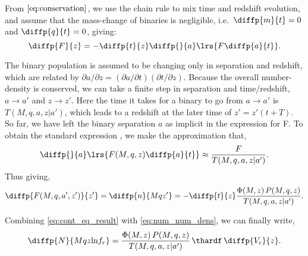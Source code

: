     From $\eqref{eq:conservation}$, we use the chain rule to mix time and redshift evolution, and assume that the mass-change of binaries is negligible, i.e.~$\diffp{m}{t} = 0$ and $\diffp{q}{t} = 0$, giving:
    \begin{equation}
        \diffp{F}{z} = - \diffp{t}{z} \diffp{}{a} \lrs{F \diffp{a}{t}}.
    \end{equation}

    The binary population is assumed to be changing only in separation and redshift, which are related by $\partial a / \partial z = (\partial a / \partial t) (\partial t / \partial z)$.  Because the overall number-density is conserved, we can take a finite step in separation and time/redshift, $a\rightarrow a'$ and $z\rightarrow z'$.  Here the time it takes for a binary to go from $a \rightarrow a'$ is $T(M,q,a,z|a')$, which leads to a redshift at the later time of $z' = z'(t + T)$.  So far, we have left the binary separation $a$ as implicit in the expression for F.  To obtain the standard expression \citep[e.g.][~Eq.~5]{Chen+2019}, we make the approximation that,
    \begin{equation}
        \diffp{}{a} \lrs{F(M,q,z) \diffp{a}{t}} \approx \frac{F}{T(M,q,a,z|a')}.
    \end{equation}
    Thus giving,
    \begin{equation}
        \label{eq:cont_eq_result}
        \diffp{F(M,q,a',z')}{{z'}} = \diffp{n}{{M}{q}{z'}} = - \diffp{t}{z} \frac{\Phi(M,z) \, P(M,q,z)}{T(M,q,a,z|a')}.
    \end{equation}

    Combining \eqref{eq:cont_eq_result} with \eqref{eq:num_num_dens}, we can finally write,
    \begin{equation}
        \label{eq:sam_final}
        \diffp{N}{{M}{q}{z}{\ln\!f_r}} = \frac{\Phi(M,z) \, P(M,q,z)}{T(M,q,a,z|a')} \, \thardf \, \diffp{V_c}{z}.
    \end{equation}


